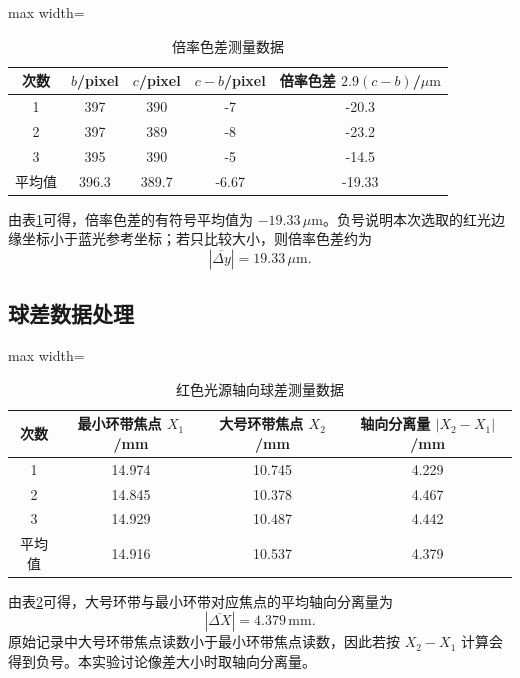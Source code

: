 \documentclass[12pt,a4paper]{article}
\begin{document}
\begin{table}[H]
  \centering
  \caption{倍率色差测量数据}
  \label{tab:lateral-color}
  \begin{adjustbox}{max width=\textwidth}
    \begin{tabular}{ccccc}
      \toprule
      次数 & $b$/pixel & $c$/pixel & $c-b$/pixel & 倍率色差 $2.9(c-b)$/$\mu\mathrm{m}$\\
      \midrule
      1 & 397 & 390 & -7 & -20.3\\
      2 & 397 & 389 & -8 & -23.2\\
      3 & 395 & 390 & -5 & -14.5\\
      \midrule
      平均值 & 396.3 & 389.7 & -6.67 & -19.33\\
      \bottomrule
    \end{tabular}
  \end{adjustbox}
\end{table}

由表\ref{tab:lateral-color}可得，倍率色差的有符号平均值为 $-19.33\,\mu\mathrm{m}$。负号说明本次选取的红光边缘坐标小于蓝光参考坐标；若只比较大小，则倍率色差约为
\begin{equation}
  |\overline{\Delta y}|=19.33\,\mu\mathrm{m}.
\end{equation}

\subsection{球差数据处理}

\begin{table}[H]
  \centering
  \caption{红色光源轴向球差测量数据}
  \label{tab:axial-spherical}
  \begin{adjustbox}{max width=\textwidth}
    \begin{tabular}{cccc}
      \toprule
      次数 & 最小环带焦点 $X_1$/mm & 大号环带焦点 $X_2$/mm & 轴向分离量 $|X_2-X_1|$/mm\\
      \midrule
      1 & 14.974 & 10.745 & 4.229\\
      2 & 14.845 & 10.378 & 4.467\\
      3 & 14.929 & 10.487 & 4.442\\
      \midrule
      平均值 & 14.916 & 10.537 & 4.379\\
      \bottomrule
    \end{tabular}
  \end{adjustbox}
\end{table}

由表\ref{tab:axial-spherical}可得，大号环带与最小环带对应焦点的平均轴向分离量为
\begin{equation}
  |\overline{\Delta X}|=4.379\,\mathrm{mm}.
\end{equation}
原始记录中大号环带焦点读数小于最小环带焦点读数，因此若按 $X_2-X_1$ 计算会得到负号。本实验讨论像差大小时取轴向分离量。
\end{document}
